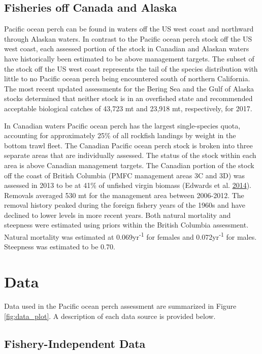 \documentclass[12pt,]{article}
\begin{document}
\subsection{Fisheries off Canada and
Alaska}\label{fisheries-off-canada-and-alaska}

Pacific ocean perch can be found in waters off the US west coast and
northward through Alaskan waters. In contrast to the Pacific ocean perch
stock off the US west coast, each assessed portion of the stock in
Canadian and Alaskan waters have historically been estimated to be above
management targets. The subset of the stock off the US west coast
represents the tail of the species distribution with little to no
Pacific ocean perch being encountered south of northern California. The
most recent updated assessments for the Bering Sea and the Gulf of
Alaska stocks determined that neither stock is in an overfished state
and recommended acceptable biological catches of 43,723 mt and 23,918
mt, respectively, for 2017.

In Canadian waters Pacific ocean perch has the largest single-species
quota, accounting for approximately 25\% of all rockfish landings by
weight in the bottom trawl fleet. The Canadian Pacific ocean perch stock
is broken into three separate areas that are individually assessed. The
status of the stock within each area is above Canadian management
targets. The Canadian portion of the stock off the coast of British
Columbia (PMFC management areas 3C and 3D) was assessed in 2013 to be at
41\% of unfished virgin biomass (Edwards et al.
\protect\hyperlink{ref-edwards_pacific_2014}{2014}). Removals averaged
530 mt for the management area between 2006-2012. The removal history
peaked during the foreign fishery years of the 1960s and have declined
to lower levels in more recent years. Both natural mortality and
steepness were estimated using priors within the British Columbia
assessment. Natural mortality was estimated at
0.069yr\textsuperscript{-1} for females and 0.072yr\textsuperscript{-1}
for males. Steepness was estimated to be 0.70.

\section{Data}\label{data}

Data used in the Pacific ocean perch assessment are summarized in Figure
\ref{fig:data_plot}. A description of each data source is provided
below.

\subsection{Fishery-Independent Data}\label{fishery-independent-data}
\end{document}

